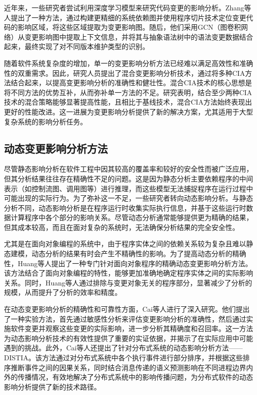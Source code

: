 近年来，一些研究者尝试利用深度学习模型来研究代码变更的影响分析。Zhang等人\cite{10366673}提出了一种方法，通过构建更精细的系统依赖图并使用程序切片技术定位变更代码的影响区域，将这些区域提取为变更影响图。随后，他们采用GCN（图卷积网络）从变更影响图中提取上下文信息，并将其与抽象语法树中的语法变更数据结合起来，最终实现了对不同版本维护类型的识别。

随着软件系统复杂度的增加，单一的变更影响分析方法已经难以满足高效性和准确性的双重需求。因此，研究人员提出了混合变更影响分析技术，通过将多种CIA方法结合起来，以提高变更影响分析的准确性和健壮性\cite{2021Improving}。混合CIA技术的核心思想是将不同方法的优势互补，从而弥补单一方法的不足。研究表明，结合至少两种CIA技术的混合策略能够显著提高性能，且相比于基线技术，混合CIA方法始终表现出更好的性能改进。这一进展为变更影响分析提供了新的解决方案，尤其适用于大型复杂系统的影响分析任务。


\subsection{动态变更影响分析方法}

尽管静态影响分析在软件工程中因其较高的覆盖率和较好的安全性而被广泛应用，但其分析结果往往存在精确性不足的问题。这是因为静态分析主要依赖程序的中间表示（如控制流图、调用图等）进行推理，而这些模型无法捕捉程序在运行过程中可能出现的实际行为。为了弥补这一不足，一些研究者转向动态影响分析。与静态分析不同，动态影响分析是在程序运行时收集实际执行信息，并基于这些运行时数据计算程序中各个部分的影响关系。尽管动态分析通常能够提供更为精确的结果，但其成本较高，而且在面对复杂的系统时，无法确保分析结果的完全安全性。

尤其是在面向对象编程的系统中，由于程序实体之间的依赖关系较为复杂且难以静态建模，动态分析的结果有时会产生不精确性的影响。为了提高动态分析的精确性，Huang等人\cite{2007Precise}提出了一种专门针对面向对象程序的精确动态变更影响分析方法。该方法结合了面向对象编程的特性，能够更加准确地确定程序实体之间的实际影响关系。同时，Huang等人通过排除与变更对象无关的程序部分，显著减少了分析的规模，从而提升了分析的效率和精度。

在动态变更影响分析的精确性和可靠性方面，Cai等人\cite{2015Acom,2014Estimating}进行了深入研究。他们提出了一种实验方法，首先通过敏感性分析来评估变更影响分析的准确性，然后通过实施软件变更并观察这些变更的实际影响，进一步分析其精确度和召回率。这一方法为动态影响分析技术的有效性提供了重要的实证依据，并揭示了在实际应用中可能遇到的挑战。此外，Cai等人还提出了针对分布式系统的动态影响分析方法——DISTIA\cite{2016DistIA}。该方法通过对分布式系统中各个执行事件进行部分排序，并根据这些排序推断事件之间的因果关系，同时结合消息传递的语义预测影响在不同进程边界内外的传播情况，有效地解决了分布式系统中的影响传播问题，为分布式软件的动态影响分析提供了新的技术路径。

